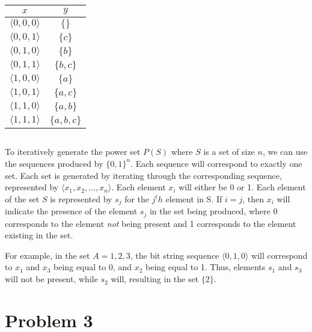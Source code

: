 \documentclass[titlepage]{article}
\begin{document}
\begin{center}
\begin{tabular}{c|c}
\textbf{$x$} & \textbf{$y$} \\ \hline
\(\langle0,0,0\rangle\) & \(\{ \}\) \\
\(\langle0,0,1\rangle\) & \(\{c\}\) \\
\(\langle0,1,0\rangle\) & \(\{b\}\) \\
\(\langle0,1,1\rangle\) & \(\{b,c\}\) \\
\(\langle1,0,0\rangle\) & \(\{a\}\) \\
\(\langle1,0,1\rangle\) & \(\{a,c\}\) \\
\(\langle1,1,0\rangle\) & \(\{a,b\}\) \\
\(\langle1,1,1\rangle\) & \(\{a,b,c\}\) \\
\end{tabular}
\end{center}

\subsection{}

To iteratively generate the power set $P(S)$ where $S$ is a set of size $n$, we can use the sequences produced by $\{0,1\}^n$. Each sequence will correspond to exactly one set. Each set is generated by iterating through the corresponding sequence, represented by \(\langle x_1,x_2,...,x_n\rangle\). Each element $x_i$ will either be 0 or 1. Each element of the set $S$ is represented by $s_j$ for the $j^th$ element in S. If $i=j$, then $x_i$ will indicate the presence of the element $s_j$ in the set being produced, where 0 corresponds to the element \textit{not} being present and 1 corresponds to the element existing in the set. 

For example, in the set $A = {1,2,3}$, the bit string sequence \(\langle0,1,0\rangle\) will correspond to $x_1$ and $x_3$ being equal to 0, and $x_2$ being equal to 1. Thus, elements $s_1$ and $s_3$ will not be present, while $s_2$ will, resulting in the set \(\{2\}\).

\section{Problem 3}

\subsection{}
\end{document}
